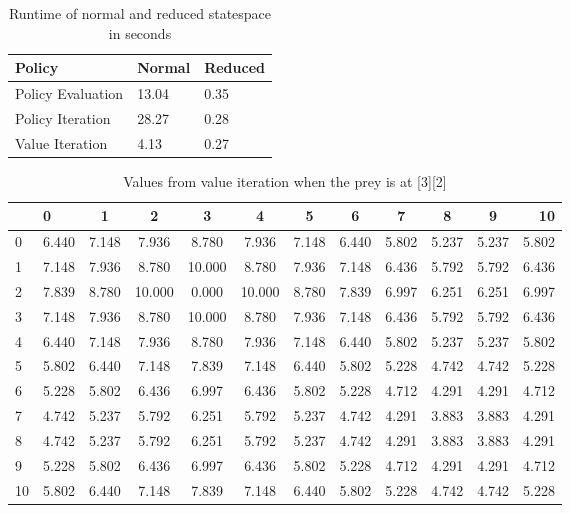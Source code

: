 \documentclass[paper=a4, fontsize=11pt]{scrartcl}
\numberwithin{equation}{section}		%
\numberwithin{figure}{section}			%
\numberwithin{table}{section}				%
\begin{document}
\begin{table}[H]
\caption{Runtime of normal and reduced statespace in seconds}
\centering
    \begin{tabular}{|l || l || l |}
    \hline
    Policy & Normal & Reduced \\ \hline
    Policy Evaluation & 13.04 & 0.35\\ \hline
    Policy Iteration & 28.27 & 0.28 \\ \hline
    Value Iteration & 4.13 & 0.27 \\
    \hline
    \end{tabular}
    \label{runtime}
\end{table}

\begin{table}[H]
\caption{Values from value iteration when the prey is at [3][2]}
\centering
\begin{tabular}{l|l*{9}{c}r}
  \hline
 & 0 & 1 & 2 & 3 & 4 & 5 & 6 & 7 & 8 & 9 & 10 \\ \hline 
0 & 6.440 & 7.148 & 7.936 & 8.780 & 7.936 & 7.148 & 6.440 & 5.802 & 5.237 & 5.237 & 5.802 \\
1 & 7.148 & 7.936 & 8.780 & 10.000 & 8.780 & 7.936 & 7.148 & 6.436 & 5.792 & 5.792 & 6.436 \\
2 & 7.839 & 8.780 & 10.000 & 0.000 & 10.000 & 8.780 & 7.839 & 6.997 & 6.251 & 6.251 & 6.997 \\
3 & 7.148 & 7.936 & 8.780 & 10.000 & 8.780 & 7.936 & 7.148 & 6.436 & 5.792 & 5.792 & 6.436 \\
4 & 6.440 & 7.148 & 7.936 & 8.780 & 7.936 & 7.148 & 6.440 & 5.802 & 5.237 & 5.237 & 5.802 \\
5 & 5.802 & 6.440 & 7.148 & 7.839 & 7.148 & 6.440 & 5.802 & 5.228 & 4.742 & 4.742 & 5.228 \\
6 & 5.228 & 5.802 & 6.436 & 6.997 & 6.436 & 5.802 & 5.228 & 4.712 & 4.291 & 4.291 & 4.712 \\
7 & 4.742 & 5.237 & 5.792 & 6.251 & 5.792 & 5.237 & 4.742 & 4.291 & 3.883 & 3.883 & 4.291 \\
8 & 4.742 & 5.237 & 5.792 & 6.251 & 5.792 & 5.237 & 4.742 & 4.291 & 3.883 & 3.883 & 4.291 \\
9 & 5.228 & 5.802 & 6.436 & 6.997 & 6.436 & 5.802 & 5.228 & 4.712 & 4.291 & 4.291 & 4.712 \\
10&5.802 & 6.440 & 7.148 & 7.839 & 7.148 & 6.440 & 5.802 & 5.228 & 4.742 & 4.742 & 5.228
\end{tabular}
\label{rVIt}
\end{table}
\end{document}
